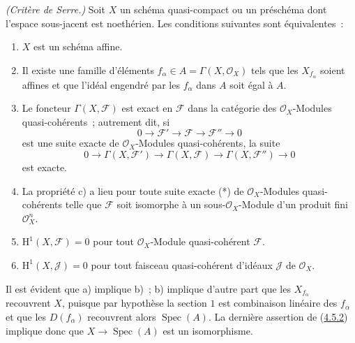 \begin{theorem}[5.2.1]
\label{II.5.2.1-fr}
\emph{(Critère de Serre.)} Soit $X$ un schéma quasi-compact ou un préschéma
dont l'espace sous-jacent est noethérien. Les conditions suivantes sont
équivalentes~:
\begin{enumerate}
  \item[\rm{a)}] $X$ est un schéma affine.
  \item[\rm{b)}] Il existe une famille d'éléments
  $f_\alpha\in A=\Gamma(X,\mathcal{O}_X)$ tels que les $X_{f_\alpha}$ soient
  affines et que l'idéal engendré par les $f_\alpha$ dans $A$ soit égal à
  $A$.
  \item[\rm{c)}] Le foncteur $\Gamma(X,\mathcal{F})$ est exact en
  $\mathcal{F}$ dans la catégorie des $\mathcal{O}_X$-Modules
  quasi-cohérents~; autrement dit, si
  \[
    0\to\mathcal{F}'\to\mathcal{F}\to\mathcal{F}''\to0 \tag{*}
  \]
  est une suite exacte de $\mathcal{O}_X$-Modules quasi-cohérents, la suite
  \[
    0\to\Gamma(X,\mathcal{F}')\to\Gamma(X,\mathcal{F})
      \to\Gamma(X,\mathcal{F}'')\to0
  \]
  est exacte.
  \item[\rm{c')}] La propriété c) a lieu pour toute suite exacte (*) de
  $\mathcal{O}_X$-Modules quasi-cohérents telle que $\mathcal{F}$ soit
  isomorphe à un sous-$\mathcal{O}_X$-Module d'un produit fini
  $\mathcal{O}_X^n$.
  \item[\rm{d)}] $\mathrm{H}^1(X,\mathcal{F})=0$ pour tout
  $\mathcal{O}_X$-Module quasi-cohérent $\mathcal{F}$.
  \item[\rm{d')}] $\mathrm{H}^1(X,\mathcal{J})=0$ pour tout faisceau
  quasi-cohérent d'idéaux $\mathcal{J}$ de $\mathcal{O}_X$.
\end{enumerate}
\end{theorem}

Il est évident que a) implique b)~; b) implique d'autre part que les
$X_{f_\alpha}$ recouvrent $X$, puisque par hypothèse la section $1$ est
combinaison linéaire des $f_\alpha$ et que les $D(f_\alpha)$ recouvrent
alors $\operatorname{Spec}(A)$. La dernière assertion de
(\hyperref[II.4.5.2-fr]{4.5.2}) implique donc que
$X\to\operatorname{Spec}(A)$ est un isomorphisme.


